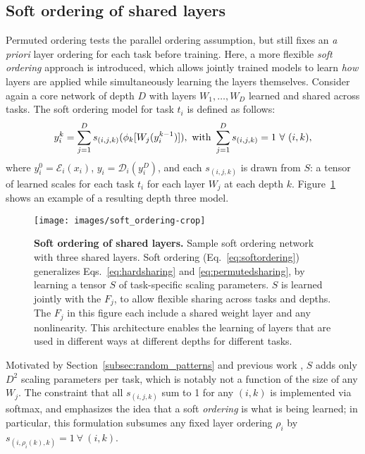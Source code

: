 \documentclass{article}
\theoremstyle{definition}
\theoremstyle{remark}
\begin{document}
\subsection{Soft ordering of shared layers} \label{subsec:soft_order}

Permuted ordering tests the parallel ordering assumption, but still fixes an \emph{a priori} layer ordering for each task before training.
Here, a more flexible \emph{soft ordering} approach is introduced, which allows jointly trained models to learn \emph{how} layers are applied while simultaneously learning the layers themselves.
Consider again a core network of depth $D$ with layers $W_1, \ldots, W_D$ learned and shared across tasks. The soft ordering model for task $t_i$ is defined as follows:
\begin{equation} \label{eq:softordering}
y^{k}_i = \sum_{j=1}^D s_{(i,j,k)}(\phi_k[W_j(y^{k-1}_i)]), \\ \text{ with } \sum_{j=1}^D s_{(i,j,k)} = 1 \ \forall \ (i, k),
\end{equation}
where $y^0_i = \mathcal{E}_i(x_i)$, $y_i = \mathcal{D}_i(y^D_i)$, and each $s_{(i,j,k)}$ is drawn from $S$: a tensor of learned scales for each task $t_i$ for each layer $W_j$ at each depth $k$.
Figure~\ref{fig:soft_ordering} shows an example of a resulting depth three model.
\begin{figure}
\texttt{[image: images/soft\_ordering-crop]}
\caption{\textbf{Soft ordering of shared layers.} Sample soft ordering network with three shared layers. Soft ordering (Eq.~\ref{eq:softordering}) generalizes Eqs.~\ref{eq:hardsharing} and \ref{eq:permutedsharing}, by learning a tensor $S$ of task-specific scaling parameters. $S$ is learned jointly with the $F_j$, to allow flexible sharing across tasks and depths. The $F_j$ in this figure each include a shared weight layer and any nonlinearity. This architecture enables the learning of layers that are used in different ways at different depths for different tasks.}
\label{fig:soft_ordering}
\end{figure}
Motivated by Section~\ref{subsec:random_patterns} and previous work \citep{Misra:2016}, $S$ adds only $D^2$ scaling parameters per task, which is notably not a function of the size of any $W_j$. 
The constraint that all $s_{(i,j,k)}$ sum to 1 for any $(i,k)$ is implemented via softmax, and emphasizes the idea that a soft \emph{ordering} is what is being learned; in particular, this formulation subsumes any fixed layer ordering $\rho_i$ by $s_{(i,\rho_i(k),k)} = 1 \ \forall \ (i, k)$.
\end{document}
